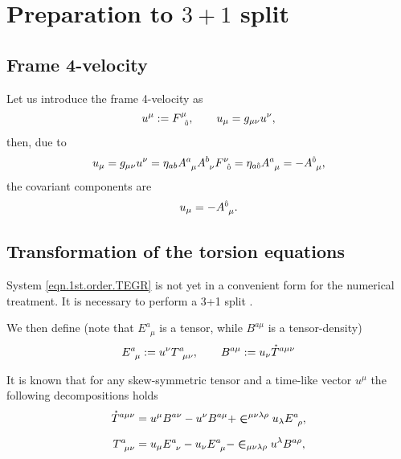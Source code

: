 \documentclass[
10pt, %
a4paper, %
oneside, %
headinclude,footinclude, %
BCOR5mm, %
]{scrartcl}
\newcommand{\itetr}[2]{F^{#1}_{\phantom{#1}#2}}
\newcommand{\tetr}[2]{A^{#1}_{\phantom{#1}#2}}
\newcommand{\Tors}[2]{T^{#1}_{\phantom{a}#2}}
\newcommand{\ET}[2]{E^{#1}_{\phantom{#1}#2}}	%
\newcommand{\BT}[2]{B^{#1#2}}	%
\newcommand{\LCsymb}{\bm{\in}}    %
\newcommand{\HDT}[1]{\accentset{\star}{T}^{#1}}
\newcommand{\indlat}[1]{\hat{\mathsmaller{#1}}}
\begin{document}
\section{Preparation to $ 3+1 $ split}


\subsection{Frame 4-velocity}

Let us introduce the frame 4-velocity as
\begin{equation}\label{eqn.4velocity}
u^\mu := \itetr{\mu}{\indlat{0}}, \qquad u_\mu = g_{\mu\nu}u^\nu,
\end{equation}
then, due to
\begin{equation}
u_\mu = g_{\mu\nu} u^\nu = \eta_{ab}\tetr{a}{\mu}\tetr{b}{\nu}\itetr{\nu}{\indlat{0}} = 
\eta_{a\indlat{0}}\tetr{a}{\mu} = -\tetr{\indlat{0}}{\mu},
\end{equation}\label{eqn.4velocity.cov}
the covariant components are
\begin{equation}
u_\mu = -\tetr{\indlat{0}}{\mu}.
\end{equation}


\subsection{Transformation of the torsion equations}\label{sec.transform.potential}


System \eqref{eqn.1st.order.TEGR} is not yet in a convenient form for the numerical treatment. It 
is necessary to perform a 3+1 split \cite{Alcubierre2008}. 


We then define (note that $ \ET{a}{\mu} $ is a tensor, while $ \BT{a}{\mu} $ is a tensor-density)
\begin{equation}
\ET{a}{\mu} := u^\nu \Tors{a}{\mu\nu}, \qquad  \BT{a}{\mu} := u_\nu\HDT{a\mu\nu}
\end{equation}


It is known that for any skew-symmetric tensor and a time-like vector $ u^\mu $ the following 
decompositions holds
\begin{subequations}\label{eqn.T.decompos}
\begin{align}
\HDT{a\mu\nu} &= u^\mu \BT{a}{\nu} - u^\nu \BT{a}{\mu} + 
\LCsymb^{\mu\nu\lambda\rho}u_\lambda 
\ET{a}{\rho},\\[2mm]
\Tors{a}{\mu\nu} &= u_\mu \ET{a}{\nu} - u_\nu \ET{a}{\mu} - 
\LCsymb_{\mu\nu\lambda\rho}u^\lambda 
\BT{a}{\rho},
\end{align}
\end{subequations}
\end{document}
